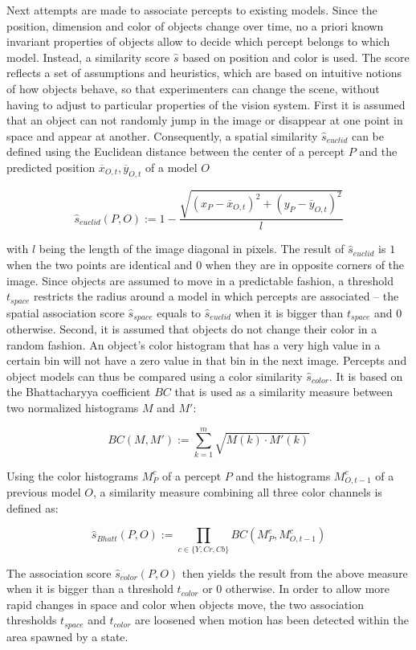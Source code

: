 Next attempts are made to associate percepts to existing models.
Since the position, dimension and color of objects change over time,
no a priori known invariant properties of objects allow to decide
which percept belongs to which model. Instead, a similarity score
$\hat{s}$ based on position and color is used. The score reflects a
set of assumptions and heuristics, which are based on intuitive
notions of how objects behave, so that experimenters can change the
scene, without having to adjust to particular properties of the vision
system.  First it is assumed that an object can not randomly jump in
the image or disappear at one point in space and appear at
another. Consequently, a spatial similarity $\hat{s}_{euclid}$ can be
defined using the Euclidean distance between the center of a percept
$P$ and the predicted position $\overline{x}_{O,t},\overline{y}_{O,t}$
of a model $O$

$$
\hat{s}_{euclid}(P,O):=1 - \frac{\sqrt{(x_P-\overline{x}_{O,t})^2+(y_P-\overline{y}_{O,t})^2}}{l}
$$

\noindent with $l$ being the length of the image diagonal in
pixels. The result of $\hat{s}_{euclid}$ is $1$ when the two points
are identical and $0$ when they are in opposite corners of the image.
Since objects are assumed to move in a predictable fashion, a
threshold $t_{space}$ restricts the radius around a model in which
percepts are associated -- the spatial association score
$\hat{s}_{space}$ equals to $\hat{s}_{euclid}$ when it is bigger than
$t_{space}$ and $0$ otherwise. Second, it is assumed that objects do
not change their color in a random fashion. An object's color
histogram that has a very high value in a certain bin will not have a
zero value in that bin in the next image. Percepts and object models
can thus be compared using a color similarity $\hat{s}_{color}$. It is
based on the Bhattacharyya coefficient $BC$
\citep{bhattacharyya43measure,aherne98bhattacharyya} that is used as a
similarity measure between two normalized histograms $M$ and $M'$:

$$BC(M,M'):=\sum_{k=1}^{m}\sqrt{M(k) \cdot M'(k)}$$

\noindent Using the color histograms $M_P^c$ of a percept $P$ and the
histograms $M_{O,t-1}^c$ of a previous model $O$, a similarity measure
combining all three color channels is defined as:

$$
\hat{s}_{Bhatt}(P,O) := \prod_{c \in \{Y,Cr,Cb\}} BC(M^c_P,M^c_{O,t-1})
$$

\noindent The association score $\hat{s}_{color}(P,O)$ then yields the
result from the above measure when it is bigger than a threshold
$t_{color}$ or $0$ otherwise. In order to allow more rapid changes in
space and color when objects move, the two association thresholds
$t_{space}$ and $t_{color}$ are loosened when motion has been detected
within the area spawned by a state.

